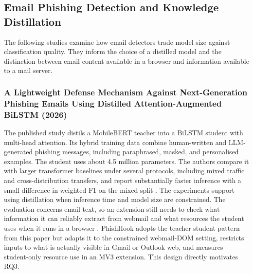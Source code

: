 \documentclass{FastFyp}
\begin{document}
\subsection{Email Phishing Detection and Knowledge Distillation}
The following studies examine how email detectors trade model size against classification quality. They inform the choice of a distilled model and the distinction between email content available in a browser and information available to a mail server.

\subsubsection{A Lightweight Defense Mechanism Against Next-Generation Phishing Emails Using Distilled Attention-Augmented BiLSTM (2026)}
The published study distils a MobileBERT teacher into a BiLSTM student with multi-head attention. Its hybrid training data combine human-written and LLM-generated phishing messages, including paraphrased, masked, and personalised examples. The student uses about 4.5 million parameters. The authors compare it with larger transformer baselines under several protocols, including mixed traffic and cross-distribution transfers, and report substantially faster inference with a small difference in weighted F1 on the mixed split \cite{distilbilstm2026}. The experiments support using distillation when inference time and model size are constrained. The evaluation concerns email text, so an extension still needs to check what information it can reliably extract from webmail and what resources the student uses when it runs in a browser \cite{distilbilstm2026}. PhishHook adopts the teacher-student pattern from this paper but adapts it to the constrained webmail-DOM setting, restricts inputs to what is actually visible in Gmail or Outlook web, and measures student-only resource use in an MV3 extension. This design directly motivates RQ3.
\end{document}
